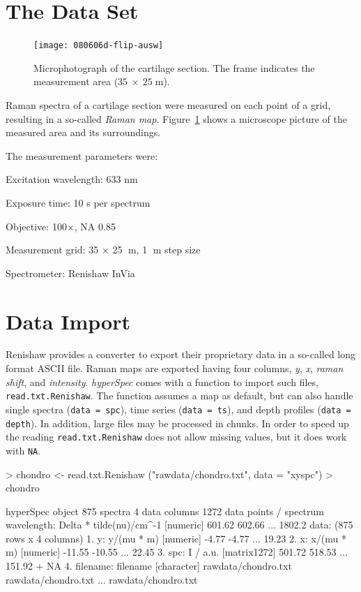 \documentclass[english, a4paper, 10pt, headings=small, DIV11]{scrartcl}
\renewenvironment{Schunk}{\vspace{0pt}\begin{small}}{\end{small}\vspace{0pt}}
\newcommand{\Rcode}[2][]{\texorpdfstring{\nohyphens{#1\texttt{#2}}}{#2}}
\newcommand{\Rfunction}[2][]{\texorpdfstring{\nohyphens{#1\texttt{#2}}}{#2}}
\newcommand{\Rpackage}[1]{\texorpdfstring{\nohyphens{\textit{#1}}}{#1}}
\newcommand{\mum}[1]{\ensuremath{#1\;}\textmu m\xspace}
\begin{document}
\section{The Data Set}
\begin{figure}
\noindent 
\begin{centering}
  \texttt{[image: 080606d-flip-ausw]}
  \par
\end{centering}
\caption{\label{fig:vis-all}Microphotograph of the cartilage section. The frame indicates the
  measurement area (\mum{35~\times~25}).}
\end{figure}

Raman spectra of a cartilage section were measured on each point of a grid, resulting in a so-called
\emph{Raman map}. Figure~\ref{fig:vis-all} shows a microscope picture of the measured area and its
surroundings.

The measurement parameters were:
\begin{compactdesc}
\item [Excitation wavelength:] 633 nm
\item [Exposure time:] 10 s per spectrum
\item [Objective:] 100$\times$, NA 0.85
\item [Measurement grid:] 35 $\times$ 25 \mum{}, 1 \mum{} step size
\item [Spectrometer:] Renishaw InVia
\end{compactdesc}

\section{Data Import}
Renishaw provides a converter to export their proprietary data in a so-called long format ASCII
file. Raman maps are exported having four columns, \emph{y}, \emph{x}, \emph{raman shift}, and
\emph{intensity}.  \Rpackage{hyperSpec} comes with a function to import such files,
\Rfunction{read.txt.Renishaw}. The function assumes a map as default, but can also handle single
spectra (\Rcode{data = \textquotedbl{}spc\textquotedbl{}}), time series (\Rcode{data =
  \textquotedbl{}ts\textquotedbl{}}), and depth profiles (\Rcode{data =
\textquotedbl{}depth\textquotedbl{}}).  In addition, large files may be processed in chunks. In order
to speed up the reading \Rfunction{read.txt.Renishaw} does not allow missing values, but it does work
with \Rcode{NA}.
\begin{Schunk}
\begin{Sinput}
> chondro <- read.txt.Renishaw ("rawdata/chondro.txt", data = "xyspc")
> chondro
\end{Sinput}
\begin{Soutput}
hyperSpec object
   875 spectra
   4 data columns
   1272 data points / spectrum
wavelength: Delta * tilde(nu)/cm^-1 [numeric] 601.62 602.66 ... 1802.2 
data:  (875 rows x 4 columns)
   1. y: y/(mu * m) [numeric] -4.77 -4.77 ... 19.23 
   2. x: x/(mu * m) [numeric] -11.55 -10.55 ... 22.45 
   3. spc: I / a.u. [matrix1272] 501.72 518.53 ... 151.92 + NA
   4. filename: filename [character] rawdata/chondro.txt rawdata/chondro.txt ... rawdata/chondro.txt 
\end{Soutput}
\end{Schunk}
\end{document}
